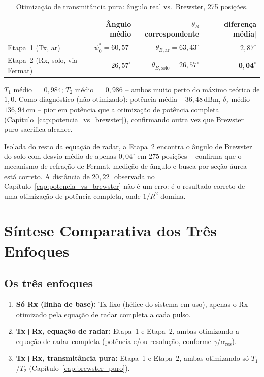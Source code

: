 \documentclass[12pt,a4paper,oneside]{book}
\newcommand{\result}[2]{%
  \begin{tcolorbox}[enhanced, breakable,
    colback=yellow!8, colframe=orange!70!black,
    fonttitle=\bfseries,
    title={\protect#1},
    attach boxed title to top left={yshift=-2mm, xshift=5mm},
    boxed title style={colback=orange!70!black}]
    #2
  \end{tcolorbox}}
\theoremstyle{definition}
\theoremstyle{remark}
\newcommand{\thetaBar}{\theta_{B,\mathrm{ar}}}
\newcommand{\thetaBsolo}{\theta_{B,\mathrm{solo}}}
\newcommand{\dz}{\delta_z}
\begin{document}
\begin{table}[H]
\centering
\caption{Otimização de transmitância pura: ângulo real vs.\ Brewster, 275 posições.}
\label{tab:brewster_puro}
\begin{tabular}{lrrr}
\toprule
& Ângulo médio & $\theta_B$ correspondente & $\lvert$diferença média$\rvert$ \\
\midrule
Etapa~1 (Tx, ar) & $\psi_0^*=60{,}57^\circ$ & $\thetaBar=63{,}43^\circ$ & $2{,}87^\circ$ \\
Etapa~2 (Rx, solo, via Fermat) & $26{,}57^\circ$ & $\thetaBsolo=26{,}57^\circ$ & $\mathbf{0{,}04^\circ}$ \\
\bottomrule
\end{tabular}
\end{table}

$T_1$ médio $=0{,}984$; $T_2$ médio $=0{,}986$ -- ambos muito perto do
máximo teórico de $1{,}0$. Como diagnóstico (não otimizado): potência
média $-36{,}48\,\mathrm{dBm}$, $\dz$ médio $136{,}94\,\mathrm{cm}$ -- pior
em potência que a otimização de potência completa
(Capítulo~\ref{cap:potencia_vs_brewster}), confirmando outra vez que
Brewster puro sacrifica alcance.

\result{Conclusão do Capítulo}{
Isolada do resto da equação de radar, a Etapa~2 encontra o ângulo de
Brewster do solo com desvio médio de apenas $0{,}04^\circ$ em 275
posições -- confirma que o mecanismo de refração de Fermat, medição de
ângulo e busca por seção áurea está correto. A distância de $20{,}22^\circ$
observada no Capítulo~\ref{cap:potencia_vs_brewster} não é um erro: é o
resultado correto de uma otimização de potência completa, onde $1/R^2$
domina.
}

\chapter{Síntese Comparativa dos Três Enfoques}
\label{cap:sintese}

\section{Os três enfoques}

\begin{enumerate}
  \item \textbf{Só Rx (linha de base):} Tx fixo (hélice do sistema em
  uso), apenas o Rx otimizado pela equação de radar completa a cada pulso.
  \item \textbf{Tx+Rx, equação de radar:} Etapa~1 e Etapa~2, ambas
  otimizando a equação de radar completa (potência e/ou resolução,
  conforme $\gamma$/$\alpha_{\mathrm{res}}$).
  \item \textbf{Tx+Rx, transmitância pura:} Etapa~1 e Etapa~2, ambas
  otimizando só $T_1$/$T_2$ (Capítulo~\ref{cap:brewster_puro}).
\end{enumerate}
\end{document}

